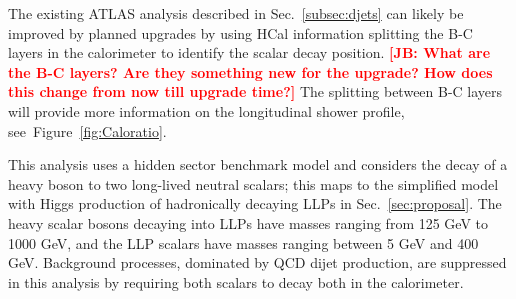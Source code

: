 The existing ATLAS analysis described in Sec.~\ref{subsec:djets} can likely be improved by planned upgrades by using HCal information splitting the B-C layers in the calorimeter to identify the scalar decay position. {\bf \textcolor{red}{[JB: What are the B-C layers?  Are they something new for the upgrade?  How does this change from now till upgrade time?]}} The splitting between B-C layers will provide more information on the longitudinal shower profile, see~Figure~\ref{fig:Caloratio}.

This analysis uses a hidden sector benchmark model and considers the decay of a heavy boson to two long-lived neutral scalars; this maps to the simplified model with Higgs production of hadronically decaying LLPs in Sec.~\ref{sec:proposal}. The heavy scalar bosons decaying into LLPs have masses ranging from 125 GeV to 1000 GeV, and the LLP scalars have masses ranging between 5 GeV and 400 GeV.
Background processes, dominated by QCD dijet production, are suppressed in this analysis by requiring both scalars to decay both in the calorimeter.

